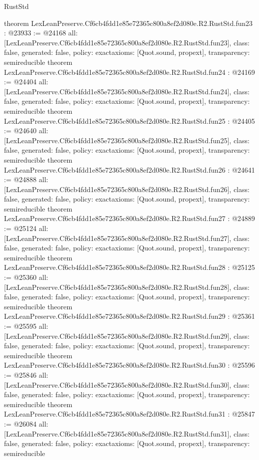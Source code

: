 \begin{lexlean}{RustStd}
\begin{coremodule}
{}
theorem LexLeanPreserve.Cf6cb4fdd1e85e72365c800a8ef2d080e.R2.RustStd.fun23 : @23933 := @24168 {
  all: [LexLeanPreserve.Cf6cb4fdd1e85e72365c800a8ef2d080e.R2.RustStd.fun23],
  class: false,
  generated: false,
  policy: exact{axioms: [Quot.sound, propext]},
  transparency: semireducible
}
theorem LexLeanPreserve.Cf6cb4fdd1e85e72365c800a8ef2d080e.R2.RustStd.fun24 : @24169 := @24404 {
  all: [LexLeanPreserve.Cf6cb4fdd1e85e72365c800a8ef2d080e.R2.RustStd.fun24],
  class: false,
  generated: false,
  policy: exact{axioms: [Quot.sound, propext]},
  transparency: semireducible
}
theorem LexLeanPreserve.Cf6cb4fdd1e85e72365c800a8ef2d080e.R2.RustStd.fun25 : @24405 := @24640 {
  all: [LexLeanPreserve.Cf6cb4fdd1e85e72365c800a8ef2d080e.R2.RustStd.fun25],
  class: false,
  generated: false,
  policy: exact{axioms: [Quot.sound, propext]},
  transparency: semireducible
}
theorem LexLeanPreserve.Cf6cb4fdd1e85e72365c800a8ef2d080e.R2.RustStd.fun26 : @24641 := @24888 {
  all: [LexLeanPreserve.Cf6cb4fdd1e85e72365c800a8ef2d080e.R2.RustStd.fun26],
  class: false,
  generated: false,
  policy: exact{axioms: [Quot.sound, propext]},
  transparency: semireducible
}
theorem LexLeanPreserve.Cf6cb4fdd1e85e72365c800a8ef2d080e.R2.RustStd.fun27 : @24889 := @25124 {
  all: [LexLeanPreserve.Cf6cb4fdd1e85e72365c800a8ef2d080e.R2.RustStd.fun27],
  class: false,
  generated: false,
  policy: exact{axioms: [Quot.sound, propext]},
  transparency: semireducible
}
theorem LexLeanPreserve.Cf6cb4fdd1e85e72365c800a8ef2d080e.R2.RustStd.fun28 : @25125 := @25360 {
  all: [LexLeanPreserve.Cf6cb4fdd1e85e72365c800a8ef2d080e.R2.RustStd.fun28],
  class: false,
  generated: false,
  policy: exact{axioms: [Quot.sound, propext]},
  transparency: semireducible
}
theorem LexLeanPreserve.Cf6cb4fdd1e85e72365c800a8ef2d080e.R2.RustStd.fun29 : @25361 := @25595 {
  all: [LexLeanPreserve.Cf6cb4fdd1e85e72365c800a8ef2d080e.R2.RustStd.fun29],
  class: false,
  generated: false,
  policy: exact{axioms: [Quot.sound, propext]},
  transparency: semireducible
}
theorem LexLeanPreserve.Cf6cb4fdd1e85e72365c800a8ef2d080e.R2.RustStd.fun30 : @25596 := @25846 {
  all: [LexLeanPreserve.Cf6cb4fdd1e85e72365c800a8ef2d080e.R2.RustStd.fun30],
  class: false,
  generated: false,
  policy: exact{axioms: [Quot.sound, propext]},
  transparency: semireducible
}
theorem LexLeanPreserve.Cf6cb4fdd1e85e72365c800a8ef2d080e.R2.RustStd.fun31 : @25847 := @26084 {
  all: [LexLeanPreserve.Cf6cb4fdd1e85e72365c800a8ef2d080e.R2.RustStd.fun31],
  class: false,
  generated: false,
  policy: exact{axioms: [Quot.sound, propext]},
  transparency: semireducible
}
\end{coremodule}
\end{lexlean}
